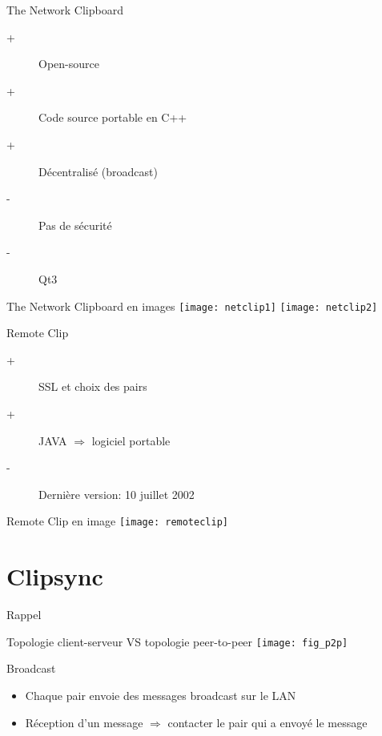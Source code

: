 \documentclass{beamer}
\begin{document}
\begin{frame}{The Network Clipboard}
  \begin{description}
  \item[+] Open-source
  \item[+] Code source portable en C++
  \item[+] Décentralisé (broadcast)
  \item[-] Pas de sécurité
  \item[-] Qt3
  \end{description}
  \begin{block}{The Network Clipboard en images}
    \center\texttt{[image: netclip1]}
    \texttt{[image: netclip2]}
  \end{block}
\end{frame}

\begin{frame}{Remote Clip}
  \begin{description}
  \item[+] SSL et choix des pairs
  \item[+] JAVA $\Rightarrow$ logiciel portable
  \item[-] Dernière version: 10 juillet 2002
  \end{description}
  \begin{block}{Remote Clip en image}
    \center\texttt{[image: remoteclip]}
  \end{block}
\end{frame}

\section{Clipsync}
\begin{frame}{Rappel}
  \begin{block}{Topologie client-serveur VS topologie peer-to-peer}
    \vspace{1em}
    \texttt{[image: fig\_p2p]}
  \end{block}
\end{frame}

\begin{frame}{Broadcast}
  \begin{itemize}
  \item Chaque pair envoie des messages broadcast sur le LAN
  \item Réception d'un message $\Rightarrow$ contacter le pair qui a
    envoyé le message
  \end{itemize}
\end{frame}
\end{document}
